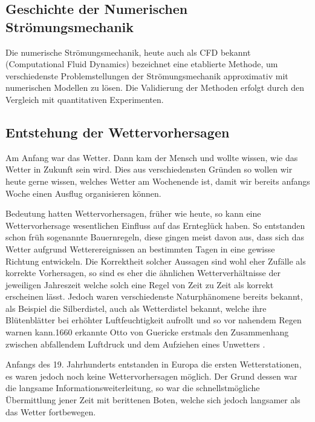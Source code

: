 \begin{refsection}
\section{Geschichte der Numerischen Strömungsmechanik
\label{klima:section:geschichte}}
Die numerische Strömungsmechanik, heute auch als CFD bekannt (Computational Fluid Dynamics) bezeichnet eine etablierte Methode, um verschiedenste Problemstellungen der Strömungsmechanik approximativ mit numerischen Modellen zu lösen. Die Validierung der Methoden erfolgt durch den Vergleich mit quantitativen Experimenten.

\subsection{Entstehung der Wettervorhersagen
\label{klima:subsection:wetter}}
Am Anfang war das Wetter. Dann kam der Mensch und wollte wissen, wie das Wetter in Zukunft sein wird. Dies aus verschiedensten Gründen so wollen wir heute gerne wissen, welches Wetter am Wochenende ist, damit wir bereits anfangs Woche einen Ausflug organisieren können.

Bedeutung hatten Wettervorhersagen, früher wie heute, so kann eine Wettervorhersage wesentlichen Einfluss auf das Ernteglück haben. So entstanden schon früh sogenannte Bauernregeln, diese gingen meist davon aus, dass sich das Wetter aufgrund Wetterereignissen an bestimmten Tagen in eine gewisse Richtung entwickeln. Die Korrektheit solcher Aussagen sind wohl eher Zufälle als korrekte Vorhersagen, so sind es eher die ähnlichen Wetterverhältnisse der jeweiligen Jahreszeit welche solch eine Regel von Zeit zu Zeit als korrekt erscheinen lässt. Jedoch waren verschiedenste Naturphänomene bereits bekannt, als Beispiel die Silberdistel, auch als Wetterdistel bekannt, welche ihre Blütenblätter bei erhöhter Luftfeuchtigkeit aufrollt und so vor nahendem Regen warnen kann.1660 erkannte Otto von Guericke erstmals den Zusammenhang zwischen abfallendem Luftdruck und dem Aufziehen eines Unwetters \cite{klima:dwd}.

Anfangs des 19. Jahrhunderts entstanden in Europa die ersten Wetterstationen, es waren jedoch noch keine Wettervorhersagen möglich. Der Grund dessen war die langsame Informationsweiterleitung, so war die schnellstmögliche Übermittlung jener Zeit mit berittenen Boten, welche sich jedoch langsamer als das Wetter fortbewegen.


\end{refsection}

